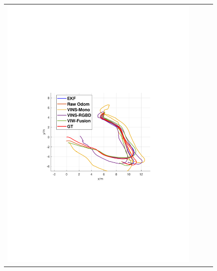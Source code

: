 \documentclass[conference]{IEEEtran}
\begin{document}
	\begin{figure}
		\begin{center}
			\begin{tabular}{cccc}
				\includegraphics[scale=0.26]{fig/darkroom2.pdf} &

\end{tabular}
\end{center}
\end{figure}
\end{document}

